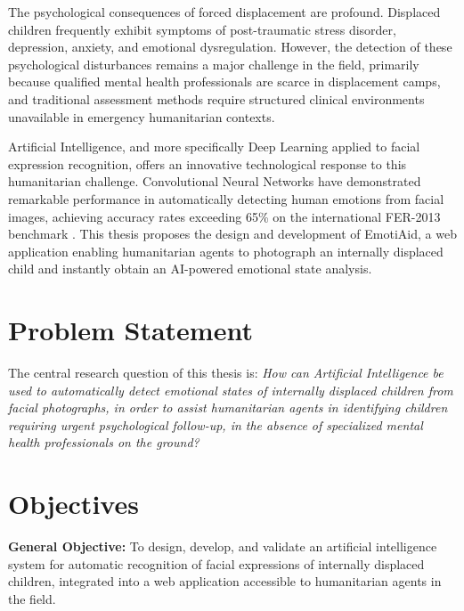 \documentclass[a4paper,12pt,oneside]{report}
\begin{document}
The psychological consequences of forced displacement are profound. Displaced
children frequently exhibit symptoms of post-traumatic stress disorder,
depression, anxiety, and emotional dysregulation. However, the detection of these
psychological disturbances remains a major challenge in the field, primarily
because qualified mental health professionals are scarce in displacement camps,
and traditional assessment methods require structured clinical environments
unavailable in emergency humanitarian contexts.

Artificial Intelligence, and more specifically Deep Learning applied to facial
expression recognition, offers an innovative technological response to this
humanitarian challenge. Convolutional Neural Networks have demonstrated remarkable
performance in automatically detecting human emotions from facial images, achieving
accuracy rates exceeding 65\% on the international FER-2013 benchmark
\cite{goodfellow2013}. This thesis proposes the design and development of
EmotiAid, a web application enabling humanitarian agents to photograph an
internally displaced child and instantly obtain an AI-powered emotional state
analysis.

\section*{Problem Statement}

The central research question of this thesis is: \textit{How can Artificial
Intelligence be used to automatically detect emotional states of internally
displaced children from facial photographs, in order to assist humanitarian
agents in identifying children requiring urgent psychological follow-up, in the
absence of specialized mental health professionals on the ground?}

\section*{Objectives}

\textbf{General Objective:} To design, develop, and validate an artificial
intelligence system for automatic recognition of facial expressions of internally
displaced children, integrated into a web application accessible to humanitarian
agents in the field.
\end{document}
